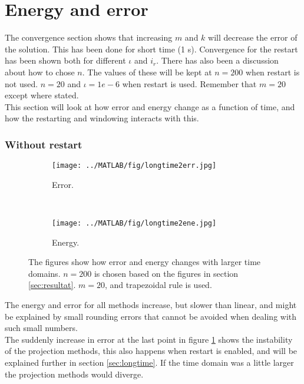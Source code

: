 \section{ Energy and error }%
\label{sec:resultconsterergy}
The convergence section shows that increasing $m$ and $k$ will decrease the error of the solution. This has been done for short time (1 s). Convergence for the restart has been shown both for different $\iota$ and $i_r$. There has also been a discussion about how to chose $n$. The values of these will be kept at $n = 200$ when restart is not used. $n = 20$ and $\iota = 1e-6$ when restart is used. Remember that $m = 20$ except where stated. \\This section will look at how error and energy change as a function of time, and how the restarting and windowing interacts with this.


\subsubsection{Without restart} %

\begin{figure}[H]
        \centering
        \begin{subfigure}[b]{0.45\textwidth}
                \texttt{[image: ../MATLAB/fig/longtime2err.jpg]}
                \caption{ Error. }
                \label{fig:longtime2err}
        \end{subfigure}
        ~
        \begin{subfigure}[b]{0.45\textwidth}
                \texttt{[image: ../MATLAB/fig/longtime2ene.jpg]}
                \caption{ Energy. }
                \label{fig:longtime8err}
        \end{subfigure}
        \caption{ The figures show how error and energy changes with larger time domains. $n = 200$ is chosen based on the figures in section \ref{sec:resultat}. $m = 20$, and trapezoidal rule is used. }
        \label{fig:SLMenergyerror0}
\end{figure}
The energy and error for all methods increase, but slower than linear, and might be explained by small rounding errors that cannot be avoided when dealing with such small numbers. \\
The suddenly increase in error at the last point in figure \ref{fig:longtime2err} shows the instability of the projection methods, this also happens when restart is enabled, and will be explained further in section \ref{sec:longtime}. If the time domain was a little larger the projection methods would diverge. 

